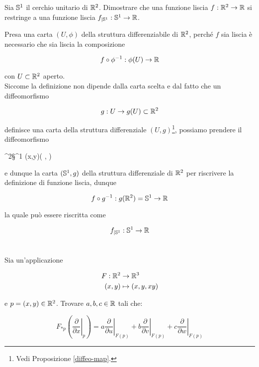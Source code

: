 \begin{tcolorbox}
	Sia $ \S^{1} $ il cerchio unitario di $ \R^{2} $. Dimostrare che una funzione liscia $ f : \R^{2} \to \R $ si restringe a una funzione liscia $ f_{|\S^{1}} : \S^{1} \to \R $.
\end{tcolorbox}

Presa una carta $ (U,\phi) $ della struttura differenziabile di $ \R^{2} $, perché $ f $ sia liscia è necessario che sia liscia la composizione

\begin{equation}
	f \circ \phi^{-1} : \phi(U) \to \R
\end{equation}

con $ U \subset \R^{2} $ aperto.\\
Siccome la definizione non dipende dalla carta scelta e dal fatto che un diffeomorfismo

\begin{equation}
	g : U \to g(U) \subset \R^{2}
\end{equation}

definisce una carta della struttura differenziale $ (U,g) $\footnote{%
	Vedi Proposizione \ref{diffeo-map}.%
}, possiamo prendere il diffeomorfismo

%
	{\R^{2}}{\S^{1}}%
	{(x,y)}{\left( , \right)}
	
e dunque la carta $ (\S^{1},g) $ della struttura differenziale di $ \R^{2} $ per riscrivere la definizione di funzione liscia, dunque

\begin{equation}
	f \circ g^{-1} : g(\R^{2}) = \S^{1} \to \R
\end{equation}

la quale può essere riscritta come

\begin{equation}
	f_{|\S^{1}} : \S^{1} \to \R
\end{equation}

\tocless\section{}\label{es2-8}

\begin{tcolorbox}
	Sia un'applicazione
	
	\begin{align}
		\begin{split}
			F : \R^{2} &\to \R^{3}\\
			(x,y) &\mapsto (x,y,xy)
		\end{split}
	\end{align}
	
	e $ p = (x,y) \in \R^{2} $. Trovare $ a,b,c \in \R $ tali che:
	
	\begin{equation}
		F_{*p} \left( \left. \dfrac{\partial}{\partial x} \right|_{p} \right) = a \left. \dfrac{\partial}{\partial u} \right|_{F(p)} + b \left. \dfrac{\partial}{\partial v} \right|_{F(p)} + c \left. \dfrac{\partial}{\partial w} \right|_{F(p)}
	\end{equation}
\end{tcolorbox}

